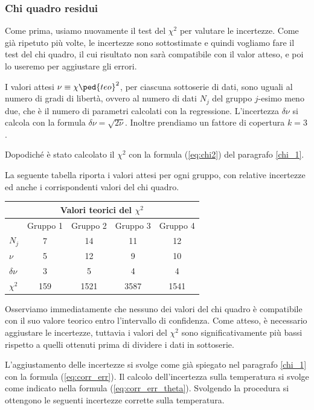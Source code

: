 \subsubsection{Chi quadro residui}

Come prima, usiamo nuovamente il test del $\chi^2$ per valutare le incertezze. Come già ripetuto più volte,
le incertezze sono sottostimate e quindi vogliamo fare il test del chi quadro, il cui risultato non sarà compatibile con il valor atteso,
e poi lo useremo per aggiustare gli errori.

I valori attesi $\nu \equiv \chi\ped{teo}^2$, per ciascuna sottoserie di dati, sono uguali al numero di gradi di libertà,
ovvero al numero di dati $N_j$ del gruppo $j$-esimo meno due, che è il numero di parametri calcolati con la regressione.
L'incertezza $\delta \nu$ si calcola con la formula $\delta \nu = \sqrt{2\nu}$. Inoltre prendiamo un fattore di copertura
$k = 3$.

Dopodiché è stato calcolato il $\chi^2$ con la formula (\ref{eq:chi2}) del paragrafo \ref{chi_1}.

La seguente tabella riporta i valori attesi per ogni gruppo, con relative incertezze ed anche i corrispondenti valori del chi quadro.

\begin{center}
    \begin{tabular}{l c c c c}
        \multicolumn{5}{c}{\textbf{Valori teorici del $\chi^2$}} \\
        \toprule
        & Gruppo 1 & Gruppo 2 & Gruppo 3 & Gruppo 4 \\
        \midrule
        $N_j$ & 7 & 14 & 11 & 12 \\
        $\nu$ & 5 & 12 & 9 & 10 \\
        $\delta \nu$ & 3 & 5 & 4 & 4 \\
        $\chi^2$ & 159 & 1521 & 3587 & 1541 \\
        \bottomrule
    \end{tabular}
\end{center}

Osserviamo immediatamente che nessuno dei valori del chi quadro è compatibile con il suo valore teorico entro l'intervallo di confidenza.
Come atteso, è necessario aggiustare le incertezze, tuttavia i valori del $\chi^2$ sono significativamente più bassi rispetto a
quelli ottenuti prima di dividere i dati in sottoserie.

L'aggiustamento delle incertezze si svolge come già spiegato nel paragrafo \ref{chi_1} con la formula (\ref{eq:corr_err}).
Il calcolo dell'incertezza sulla temperatura si svolge come indicato nella formula (\ref{eq:corr_err_theta}).
Svolgendo la procedura si ottengono le seguenti incertezze corrette sulla temperatura.

